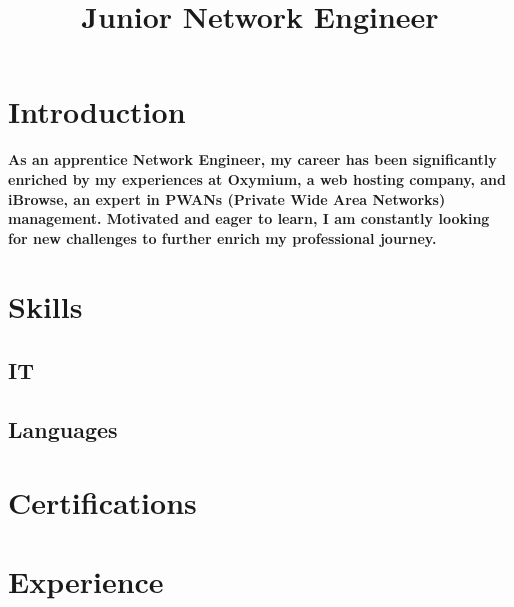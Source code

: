 \documentclass[10pt,a4paper,roman]{moderncv}
\title{Junior Network Engineer}
\begin{document}
\maketitle
\section{Introduction}

\begin{center}
\textbf{As an apprentice Network Engineer, my career has been significantly enriched by my experiences at Oxymium, a web hosting company, and iBrowse, an expert in PWANs (Private Wide Area Networks) management. Motivated and eager to learn, I am constantly looking for new challenges to further enrich my professional journey.}
\end{center}

\section{Skills}

\subsection{IT}


\subsection{Languages}

\section{Certifications}


\section{Experience}
\end{document}
